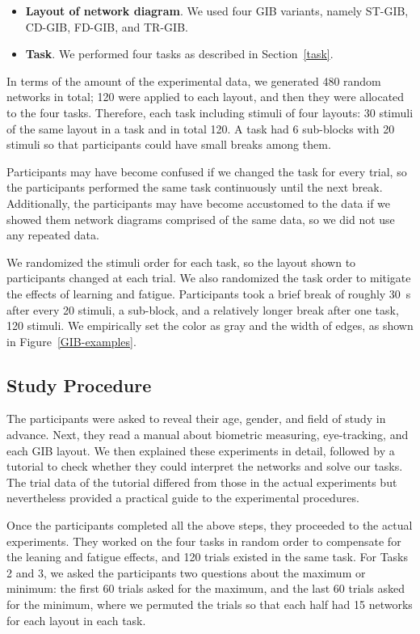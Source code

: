 \documentclass[review]{vgtc}                 %
\begin{document}
\begin{itemize}
\item {\bf Layout of network diagram}. We used four GIB variants, namely ST-GIB, CD-GIB, FD-GIB, and TR-GIB.
\item {\bf Task}. We performed four tasks as described in Section~\ref{task}.
\end{itemize}

In terms of the amount of the experimental data, we generated 480 random networks in total; 120 were applied to each layout, and then they were allocated to the four tasks. Therefore, each task including stimuli of four layouts: 30 stimuli of the same layout in a task and in total 120.
A task had 6 sub-blocks with 20 stimuli so that participants could have small breaks among them.

Participants may have become confused if we changed the task for every trial, so the participants performed the same task continuously until the next break.
Additionally, the participants may have become accustomed to the data if we showed them network diagrams comprised of the same data, so we did not use any repeated data.

We randomized the stimuli order for each task, so the layout shown to participants changed at each trial.
We also randomized the task order to mitigate the effects of learning and fatigue.
Participants took a brief break of roughly 30~s after every 20 stimuli, a sub-block, and a relatively longer break after one task, 120 stimuli.
We empirically set the color as gray and the width of edges, as shown in Figure~\ref{GIB-examples}.

\subsection{Study Procedure}

The participants were asked to reveal their age, gender, and field of study in advance.
Next, they read a manual about biometric measuring, eye-tracking, and each GIB layout.
We then explained these experiments in detail, followed by a tutorial to check whether they could interpret the networks and solve our tasks.
The trial data of the tutorial differed from those in the actual experiments but nevertheless provided a practical guide to the experimental procedures.

Once the participants completed all the above steps, they proceeded to the actual experiments.
They worked on the four tasks in random order to compensate for the leaning and fatigue effects, and 120 trials existed in the same task.
For Tasks 2 and 3, we asked the participants two questions about the maximum or minimum: the first 60 trials asked for the maximum, and the last 60 trials asked for the minimum, where we permuted the trials so that each half had 15 networks for each layout in each task.
\end{document}
